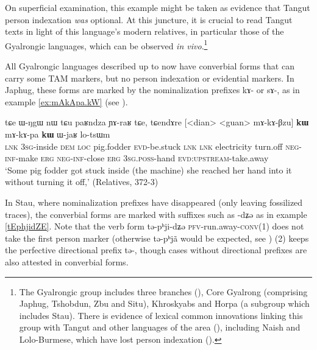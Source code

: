 \documentclass[oldfontcommands,oneside,a4paper,11pt]{article}
\newcommand{\ipa}[1]{{\phon \mbox{#1}}} %
\begin{document}
On superficial examination, this example might be taken as evidence that Tangut person indexation \textit{was} optional. At this juncture, it is crucial to read Tangut texts in light of this language's modern relatives, in particular those of the Gyalrongic languages, which can be observed \textit{in vivo}.\footnote{The Gyalrongic group includes three branches (\citealt{jackson00sidaba, jackson00puxi}), Core Gyalrong (comprising Japhug, Tshobdun, Zbu and Situ), Khroskyabs and Horpa (a subgroup which includes Stau). There is evidence of lexical common innovations linking this group with Tangut and other languages of the area (\citealt{jacques14esquisse}), including Naish and Lolo-Burmese, which have lost person indexation (\citealt{jacques.michaud11naish}).}

All Gyalrongic languages described up to now have converbial forms that can carry some TAM markers, but no person indexation or evidential markers. In Japhug, these forms are marked by the nominalization prefixes \ipa{kɤ-} or \ipa{sɤ-}, as in example \ref{ex:mAkApa.kW} (see \citealt{jacques14linking}).

\begin{exe}
\ex \label{ex:mAkApa.kW}
\gll
\ipa{tɕe}   	\ipa{ɯ-ŋgɯ}   	\ipa{nɯ} \ipa{tɕu}   	\ipa{paʁndza}   	\ipa{ɲɤ-raʁ}   	\ipa{tɕe,}   	\ipa{tɕendɤre}   	[<dian>   	<guan>   	\ipa{mɤ-kɤ-βzu}] 	\ipa{\textbf{kɯ}}   	\ipa{mɤ-kɤ-pa}   	\ipa{\textbf{kɯ}}   	\ipa{ɯ-jaʁ}   	\ipa{lo-tsɯm}   \\
\textsc{lnk} \textsc{3sg}-inside \textsc{dem} \textsc{loc} pig.fodder \textsc{evd}-be.stuck \textsc{lnk}
\textsc{lnk} electricity turn.off \textsc{neg-inf}-make \textsc{erg}  \textsc{neg-inf}-close \textsc{erg}  \textsc{3sg.poss}-hand \textsc{evd:upstream}-take.away \\
\glt `Some pig fodder got stuck inside (the machine) she reached her hand into it without turning it off,' (Relatives, 372-3)
\end{exe} 

In Stau, where nominalization prefixes have disappeared (only leaving fossilized traces), the converbial forms are marked with suffixes such as \ipa{-dʑə} as in example \ref{tEphjidZE}. Note that the verb form \ipa{tə-pʰji-dʑə} \textsc{pfv}-run.away-\textsc{conv}(1) does not take the first person marker (otherwise \ipa{tə-pʰjã} would be expected, see \citealt{jacques14rtau}) (2) keeps the perfective directional prefix \ipa{tə-}, though cases without directional prefixes are also attested in converbial forms.
\end{document}
